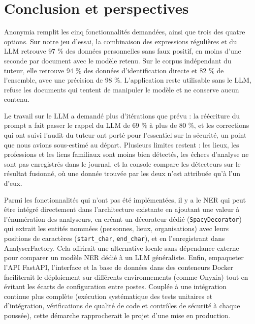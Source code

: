 \documentclass[12pt,a4paper]{article}
\begin{document}

\section{Conclusion et perspectives}

Anonymia remplit les cinq fonctionnalités demandées, ainsi que trois des quatre options. Sur notre jeu d'essai, la combinaison des expressions régulières et du LLM retrouve 97 \% des données personnelles sans faux positif, en moins d'une seconde par document avec le modèle retenu. Sur le corpus indépendant du tuteur, elle retrouve 94 \% des données d'identification directe et 82 \% de l'ensemble, avec une précision de 98 \%. L'application reste utilisable sans le LLM, refuse les documents qui tentent de manipuler le modèle et ne conserve aucun contenu.

Le travail sur le LLM a demandé plus d'itérations que prévu : la réécriture du prompt a fait passer le rappel du LLM de 69 \% à plus de 80 \%, et les corrections qui ont suivi l'audit du tuteur ont porté pour l'essentiel sur la sécurité, un point que nous avions sous-estimé au départ. Plusieurs limites restent : les lieux, les professions et les liens familiaux sont moins bien détectés, les échecs d'analyse ne sont pas enregistrés dans le journal, et la console compare les détecteurs sur le résultat fusionné, où une donnée trouvée par les deux n'est attribuée qu'à l'un d'eux.

Parmi les fonctionnalités qui n'ont pas été implémentées, il y a le NER qui peut être intégré directement dans l'architecture existante en ajoutant une valeur à l'énumération des analyseurs, en créant un décorateur dédié (\texttt{SpacyDecorator}) qui extrait les entités nommées (personnes, lieux, organisations) avec leurs positions de caractères (\texttt{start\_char}, \texttt{end\_char}), et en l'enregistrant dans AnalyserFactory. Cela offrirait une alternative locale sans dépendance externe pour comparer un modèle NER dédié à un LLM généraliste. Enfin, empaqueter l'API FastAPI, l'interface et la base de données dans des conteneurs Docker faciliterait le déploiement sur différents environnements (comme Onyxia) tout en évitant les écarts de configuration entre postes. Couplée à une intégration continue plus complète (exécution systématique des tests unitaires et d'intégration, vérifications de qualité de code et contrôles de sécurité à chaque poussée), cette démarche rapprocherait le projet d'une mise en production.
\end{document}
